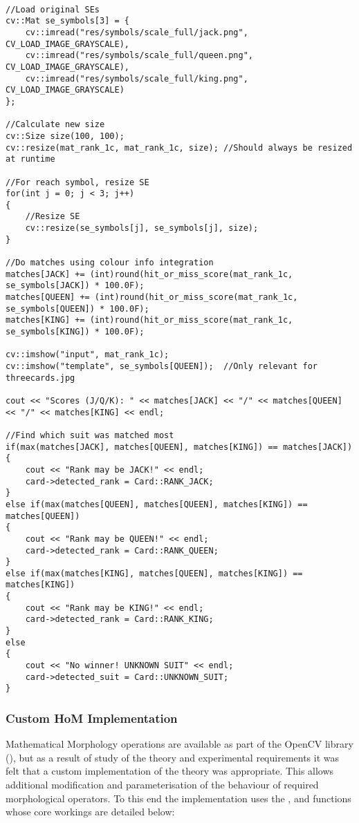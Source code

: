 			\begin{lstlisting}

//Load original SEs
cv::Mat se_symbols[3] = {
	cv::imread("res/symbols/scale_full/jack.png", CV_LOAD_IMAGE_GRAYSCALE),
	cv::imread("res/symbols/scale_full/queen.png", CV_LOAD_IMAGE_GRAYSCALE),
	cv::imread("res/symbols/scale_full/king.png", CV_LOAD_IMAGE_GRAYSCALE)
};

//Calculate new size
cv::Size size(100, 100);
cv::resize(mat_rank_1c, mat_rank_1c, size); //Should always be resized at runtime

//For reach symbol, resize SE
for(int j = 0; j < 3; j++)
{
	//Resize SE
	cv::resize(se_symbols[j], se_symbols[j], size); 
}

//Do matches using colour info integration
matches[JACK] += (int)round(hit_or_miss_score(mat_rank_1c, se_symbols[JACK]) * 100.0F);
matches[QUEEN] += (int)round(hit_or_miss_score(mat_rank_1c, se_symbols[QUEEN]) * 100.0F);
matches[KING] += (int)round(hit_or_miss_score(mat_rank_1c, se_symbols[KING]) * 100.0F);

cv::imshow("input", mat_rank_1c);
cv::imshow("template", se_symbols[QUEEN]);  //Only relevant for threecards.jpg

cout << "Scores (J/Q/K): " << matches[JACK] << "/" << matches[QUEEN] << "/" << matches[KING] << endl;

//Find which suit was matched most
if(max(matches[JACK], matches[QUEEN], matches[KING]) == matches[JACK])
{
	cout << "Rank may be JACK!" << endl;
	card->detected_rank = Card::RANK_JACK;
}
else if(max(matches[QUEEN], matches[QUEEN], matches[KING]) == matches[QUEEN])
{
	cout << "Rank may be QUEEN!" << endl;
	card->detected_rank = Card::RANK_QUEEN;
}
else if(max(matches[KING], matches[QUEEN], matches[KING]) == matches[KING])
{
	cout << "Rank may be KING!" << endl;
	card->detected_rank = Card::RANK_KING;
}
else
{
	cout << "No winner! UNKNOWN SUIT" << endl;
	card->detected_suit = Card::UNKNOWN_SUIT;
}
			\end{lstlisting}

		\subsubsection{Custom HoM Implementation}
			Mathematical Morphology operations are available as part of the OpenCV library (), but as a result of study of the theory and experimental requirements it was felt that a custom implementation of the theory was appropriate. This allows additional modification and parameterisation of the behaviour of required morphological operators. To this end the implementation uses the ,  and  functions whose core workings are detailed below:

